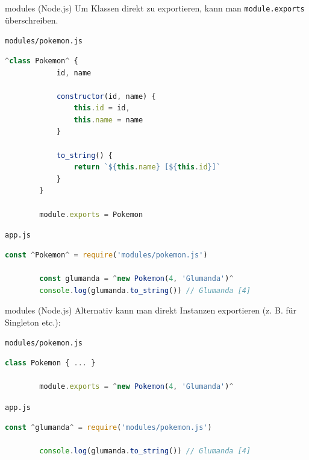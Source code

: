 \begin{example}{modules (Node.js)}
    Um Klassen direkt zu exportieren, kann man \texttt{module.exports} überschreiben.

    \texttt{modules/pokemon.js}
    \begin{lstlisting}[language=JavaScript]
        ^class Pokemon^ {
            id, name

            constructor(id, name) {
                this.id = id,
                this.name = name
            }

            to_string() {
                return `${this.name} [${this.id}]`
            }
        }

        module.exports = Pokemon
    \end{lstlisting}

    \texttt{app.js}
    \begin{lstlisting}[language=JavaScript]
        const ^Pokemon^ = require('modules/pokemon.js')

        const glumanda = ^new Pokemon(4, 'Glumanda')^
        console.log(glumanda.to_string()) // Glumanda [4]
    \end{lstlisting}
\end{example}

\begin{example}{modules (Node.js)}
    Alternativ kann man direkt Instanzen exportieren (z. B. für Singleton etc.):

    \texttt{modules/pokemon.js}
    \begin{lstlisting}[language=JavaScript]
        class Pokemon { ... }

        module.exports = ^new Pokemon(4, 'Glumanda')^
    \end{lstlisting}

    \texttt{app.js}
    \begin{lstlisting}[language=JavaScript]
        const ^glumanda^ = require('modules/pokemon.js')

        console.log(glumanda.to_string()) // Glumanda [4]
    \end{lstlisting}
\end{example}

